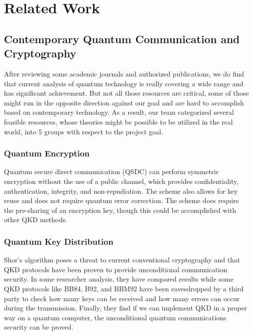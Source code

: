 \documentclass[sigconf]{acmart}
\begin{document}
\section{Related Work}
\subsection{Contemporary Quantum Communication and Cryptography} %
After reviewing some academic journals and authorized publications, we do find that current analysis of quantum technology is really covering a wide range and has significant achievement. But not all those resources are critical, some of those might run in the opposite direction against our goal and are hard to accomplish based on contemporary technology. As a result, our team categorized several feasible resources, whose theories might be possible to be utilized in the real world, into 5 groups with respect to the project goal.

\subsubsection{Quantum Encryption}
Quantum secure direct communication (QSDC) can perform symmetric encryption without the use of a public channel, which provides confidentiality, authentication, integrity, and non-repudiation. The scheme also allows for key reuse and does not require quantum error correction. The scheme does require the pre-sharing of an encryption key, though this could be accomplished with other QKD methods\cite{amerimehr_quantum_2018}.

\subsubsection{Quantum Key Distribution}

Shor’s algorithm poses a threat to current conventional cryptography and that QKD protocols have been proven to provide unconditional communication security. In some researcher analysis, they have compared results while some QKD protocols like BB84, B92, and BBM92 have been eavesdropped by a third party to check how many keys can be received and how many errors can occur during the transmission. Finally, they find if we can implement QKD in a proper way on a quantum computer, the unconditional quantum communications security can be proved\cite{nurhadi_quantum_2018}.
\end{document}
